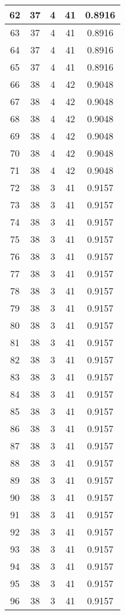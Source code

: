 \documentclass[letterpaper, 12pt]{article}
\begin{document}
\begin{longtable}{|c|c|c|c|c|}
\hline
62 & 37 & 4 & 41 & 0.8916 \\
\hline
63 & 37 & 4 & 41 & 0.8916 \\
\hline
64 & 37 & 4 & 41 & 0.8916 \\
\hline
65 & 37 & 4 & 41 & 0.8916 \\
\hline
66 & 38 & 4 & 42 & 0.9048 \\
\hline
67 & 38 & 4 & 42 & 0.9048 \\
\hline
68 & 38 & 4 & 42 & 0.9048 \\
\hline
69 & 38 & 4 & 42 & 0.9048 \\
\hline
70 & 38 & 4 & 42 & 0.9048 \\
\hline
71 & 38 & 4 & 42 & 0.9048 \\
\hline
72 & 38 & 3 & 41 & 0.9157 \\
\hline
73 & 38 & 3 & 41 & 0.9157 \\
\hline
74 & 38 & 3 & 41 & 0.9157 \\
\hline
75 & 38 & 3 & 41 & 0.9157 \\
\hline
76 & 38 & 3 & 41 & 0.9157 \\
\hline
77 & 38 & 3 & 41 & 0.9157 \\
\hline
78 & 38 & 3 & 41 & 0.9157 \\
\hline
79 & 38 & 3 & 41 & 0.9157 \\
\hline
80 & 38 & 3 & 41 & 0.9157 \\
\hline
81 & 38 & 3 & 41 & 0.9157 \\
\hline
82 & 38 & 3 & 41 & 0.9157 \\
\hline
83 & 38 & 3 & 41 & 0.9157 \\
\hline
84 & 38 & 3 & 41 & 0.9157 \\
\hline
85 & 38 & 3 & 41 & 0.9157 \\
\hline
86 & 38 & 3 & 41 & 0.9157 \\
\hline
87 & 38 & 3 & 41 & 0.9157 \\
\hline
88 & 38 & 3 & 41 & 0.9157 \\
\hline
89 & 38 & 3 & 41 & 0.9157 \\
\hline
90 & 38 & 3 & 41 & 0.9157 \\
\hline
91 & 38 & 3 & 41 & 0.9157 \\
\hline
92 & 38 & 3 & 41 & 0.9157 \\
\hline
93 & 38 & 3 & 41 & 0.9157 \\
\hline
94 & 38 & 3 & 41 & 0.9157 \\
\hline
95 & 38 & 3 & 41 & 0.9157 \\
\hline
96 & 38 & 3 & 41 & 0.9157 \\

\end{longtable}
\end{document}
